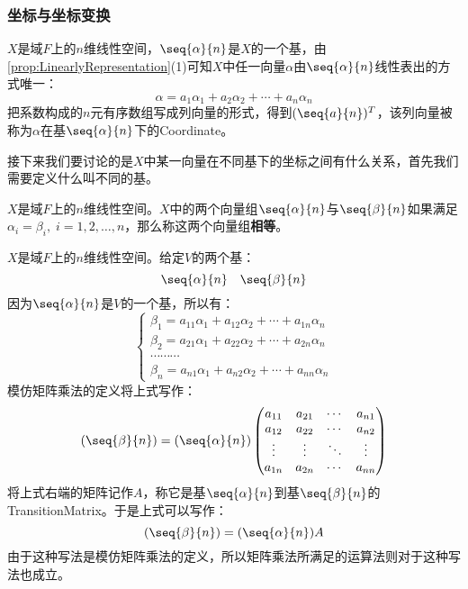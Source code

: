 \subsubsection{坐标与坐标变换}
\begin{definition}
	$X$是域$F$上的$n$维线性空间，$\seq{\alpha}{n}$是$X$的一个基，由\cref{prop:LinearlyRepresentation}(1)可知$X$中任一向量$\alpha$由$\seq{\alpha}{n}$线性表出的方式唯一：
	\begin{equation*}
		\alpha=a_1\alpha_1+a_2\alpha_2+\cdots+a_n\alpha_n
	\end{equation*}
	把系数构成的$n$元有序数组写成列向量的形式，得到$(\seq{a}{n})^T$，该列向量被称为$\alpha$在基$\seq{\alpha}{n}$下的\gls{Coordinate}。
\end{definition}
接下来我们要讨论的是$X$中某一向量在不同基下的坐标之间有什么关系，首先我们需要定义什么叫不同的基。
\begin{definition}
	$X$是域$F$上的$n$维线性空间。$X$中的两个向量组$\seq{\alpha}{n}$与$\seq{\beta}{n}$如果满足$\alpha_i=\beta_i,\;i=1,2,\dots,n$，那么称这两个向量组\textbf{相等}。
\end{definition}
\begin{definition}
	$X$是域$F$上的$n$维线性空间。给定$V$的两个基：
	\begin{equation*}
		\seq{\alpha}{n}\quad\seq{\beta}{n}
	\end{equation*}
	因为$\seq{\alpha}{n}$是$V$的一个基，所以有：
	\begin{equation*}
		\begin{cases}
			\beta_1=a_{11}\alpha_1+a_{12}\alpha_2+\cdots+a_{1n}\alpha_n \\
			\beta_2=a_{21}\alpha_1+a_{22}\alpha_2+\cdots+a_{2n}\alpha_n \\
			\cdots\cdots\cdots \\
			\beta_n=a_{n1}\alpha_1+a_{n2}\alpha_2+\cdots+a_{nn}\alpha_n
		\end{cases}
	\end{equation*}
	模仿矩阵乘法的定义将上式写作：
	\begin{equation*}
		(\seq{\beta}{n})=(\seq{\alpha}{n})
		\begin{pmatrix}
			a_{11} & a_{21} & \cdots & a_{n1} \\
			a_{12} & a_{22} & \cdots & a_{n2} \\
			\vdots & \vdots & \ddots & \vdots \\
			a_{1n} & a_{2n} & \cdots & a_{nn}
		\end{pmatrix}
	\end{equation*}
	将上式右端的矩阵记作$A$，称它是基$\seq{\alpha}{n}$到基$\seq{\beta}{n}$的\gls{TransitionMatrix}。于是上式可以写作：
	\begin{equation*}
		(\seq{\beta}{n})=(\seq{\alpha}{n})A
	\end{equation*}
	由于这种写法是模仿矩阵乘法的定义，所以矩阵乘法所满足的运算法则对于这种写法也成立。
\end{definition}
